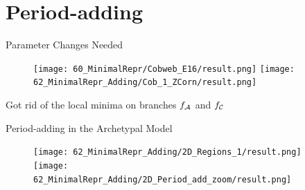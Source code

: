 \section{Period-adding}

\begin{frame}{Parameter Changes Needed}
	\vspace{-1em}
	\begin{figure}
		\texttt{[image: 60\_MinimalRepr/Cobweb\_E16/result.png]}
		\quad
		\texttt{[image: 62\_MinimalRepr\_Adding/Cob\_1\_ZCorn/result.png]}
	\end{figure}
	\vspace{1em}
	Got rid of the local minima on branches $f_{\mathcal{A}}$ and $f_{\mathcal{C}}$
\end{frame}

\begin{frame}{Period-adding in the Archetypal Model}
	\begin{figure}
		\texttt{[image: 62\_MinimalRepr\_Adding/2D\_Regions\_1/result.png]}
		\quad
		\texttt{[image: 62\_MinimalRepr\_Adding/2D\_Period\_add\_zoom/result.png]}
	\end{figure}
\end{frame}

